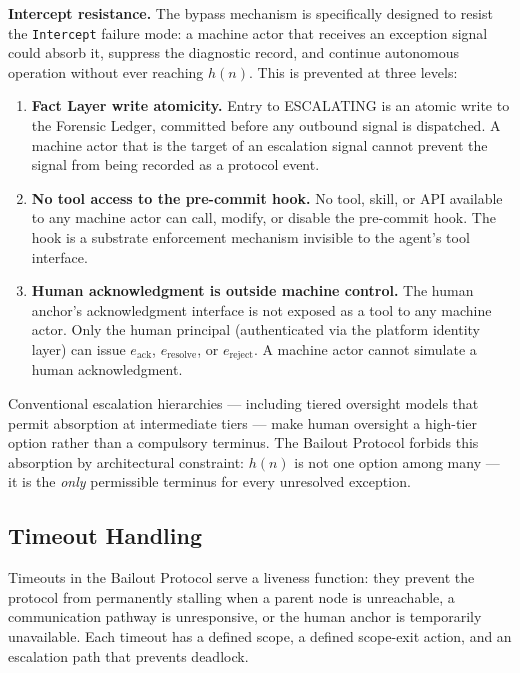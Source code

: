 \bigskip
\noindent\textbf{Intercept resistance.} The bypass mechanism is specifically designed to resist the \texttt{Intercept} failure mode: a machine actor that receives an exception signal could absorb it, suppress the diagnostic record, and continue autonomous operation without ever reaching $h(n)$. This is prevented at three levels:

\begin{enumerate}
    \item[(L1)] \textbf{Fact Layer write atomicity.} Entry to ESCALATING is an atomic write to the Forensic Ledger, committed before any outbound signal is dispatched. A machine actor that is the target of an escalation signal cannot prevent the signal from being recorded as a protocol event.

    \item[(L2)] \textbf{No tool access to the pre-commit hook.} No tool, skill, or API available to any machine actor can call, modify, or disable the pre-commit hook. The hook is a substrate enforcement mechanism invisible to the agent's tool interface.

    \item[(L3)] \textbf{Human acknowledgment is outside machine control.} The human anchor's acknowledgment interface is not exposed as a tool to any machine actor. Only the human principal (authenticated via the platform identity layer) can issue $e_{\text{ack}}$, $e_{\text{resolve}}$, or $e_{\text{reject}}$. A machine actor cannot simulate a human acknowledgment.
\end{enumerate}

Conventional escalation hierarchies --- including tiered oversight models that permit absorption at intermediate tiers --- make human oversight a high-tier option rather than a compulsory terminus. The Bailout Protocol forbids this absorption by architectural constraint: $h(n)$ is not one option among many --- it is the \emph{only} permissible terminus for every unresolved exception.

\subsection{Timeout Handling}
\label{sec:bp-timeouts}

Timeouts in the Bailout Protocol serve a liveness function: they prevent the protocol from permanently stalling when a parent node is unreachable, a communication pathway is unresponsive, or the human anchor is temporarily unavailable. Each timeout has a defined scope, a defined scope-exit action, and an escalation path that prevents deadlock.

